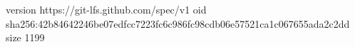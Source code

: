 version https://git-lfs.github.com/spec/v1
oid sha256:42b84642246be07edfcc7223fc6c986fc98cdb06e57521ca1c067655ada2c2dd
size 1199
